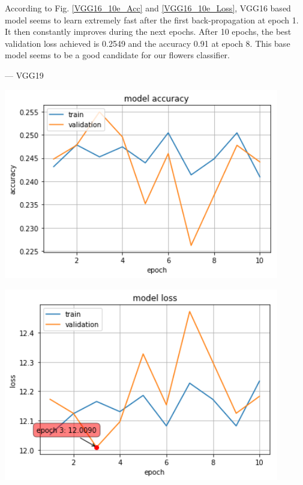 According to Fig. \ref{VGG16_10e_Acc} and \ref{VGG16_10e_Loss}, VGG16 based model seems to learn extremely fast after the first back-propagation at epoch 1. It then constantly improves during the next epochs. After 10 epochs, the best validation loss achieved is 0.2549  and the accuracy 0.91 at epoch 8. This base model seems to be a good candidate for our flowers classifier.

--- VGG19
\begin{center}
	\centering
	\begin{minipage}{0.5\textwidth}
		\centering
		\includegraphics[width=0.9\textwidth]{./sections/03_methodology/VGG19_10epochs_acc.png}
		\label{VGG19_10e_Acc}
	\end{minipage}\hfill
	\begin{minipage}{0.5\textwidth}
		\centering
		\includegraphics[width=0.9\textwidth]{./sections/03_methodology/VGG19_10epochs_loss.png} 
		\label{VGG19_10e_Loss}
	\end{minipage}
\end{center}

